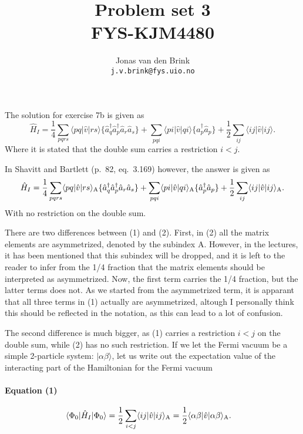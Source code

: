 \documentclass[a4paper, 11pt, notitlepage, english]{article}
\author{Jonas van den Brink \\ \texttt{j.v.brink@fys.uio.no}}
\title{Problem set 3 \\ FYS-KJM4480}
\newcommand{\ket}[1]{|#1 \rangle}
\newcommand{\op}[1]{\hat{#1}}
\newcommand{\braopket}[3]{\langle #1 | {#2} | #3 \rangle}
\begin{document}
\pagestyle{empty}

The solution for exercise 7b is given as
\begin{equation}
\op{H}_I = \frac{1}{4}\sum_{pqrs}\braopket{pq}{\op{v}}{rs}\{\op{a}_q^\dag \op{a}_p^\dag \op{a}_r \op{a}_s\} + \sum_{pqi}\braopket{pi}{\op{v}}{qi}\{\op{a}_p^\dag\op{a}_p\} + \frac{1}{2}\sum_{ij}	\braopket{ij}{\op{v}}{ij}.
\end{equation}
Where it is stated that the double sum carries a restriction $i<j$.

In Shavitt and Bartlett (p.\ 82, eq.\ 3.169) however, the answer is given as
\begin{equation}
\op{H}_I = \frac{1}{4}\sum_{pqrs}\braopket{pq}{\op{v}}{rs}_{\rm A}\{\op{a}_q^\dag \op{a}_p^\dag \op{a}_r \op{a}_s\} + \sum_{pqi}\braopket{pi}{\op{v}}{qi}_{\rm A}\{\op{a}_p^\dag\op{a}_p\} + \frac{1}{2}\sum_{ij}	\braopket{ij}{\op{v}}{ij}_{\rm A}.
\end{equation}
With no restriction on the double sum.

There are two differences between (1) and (2). First, in (2) all the matrix elements are asymmetrized, denoted by the subindex A. However, in the lectures, it has been mentioned that this subindex will be dropped, and it is left to the reader to infer from the 1/4 fraction that the matrix elements should be interpreted as asymmetrized. Now, the first term carries the 1/4 fraction, but the latter terms does not. As we started from the asymmetrized term, it is apparant that all three terms in (1) actually are asymmetrized, altough I personally think this should be reflected in the notation, as this can lead to a lot of confusion.

The second difference is much bigger, as (1) carries a restriction $i<j$ on the double sum, while (2) has no such restriction. If we let the Fermi vacuum be a simple 2-particle system: $\ket{\alpha\beta}$, let us write out the expectation value of the interacting part of the Hamiltonian for the Fermi vacuum
\paragraph{Equation (1)}
\begin{align*}
\braopket{\Phi_0}{\op{H}_I}{\Phi_0} &= \frac{1}{2}\sum_{i<j} \braopket{ij}{\op{v}}{ij}_{\rm A} = \frac{1}{2}\braopket{\alpha\beta}{\op{v}}{\alpha\beta}_{\rm A}.
\end{align*}
\end{document}
